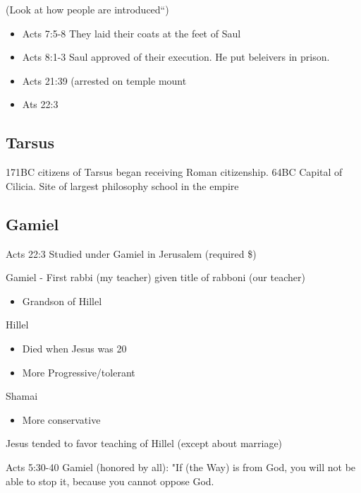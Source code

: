 \documentclass[
]{book}
\providecommand{\tightlist}{%
  \setlength{\itemsep}{0pt}\setlength{\parskip}{0pt}}
\begin{document}
(Look at how people are introduced``)

\begin{itemize}
\tightlist
\item
  Acts 7:5-8 They laid their coats at the feet of Saul
\item
  Acts 8:1-3 Saul approved of their execution. He put beleivers in prison.
\item
  Acts 21:39 (arrested on temple mount
\item
  Ats 22:3
\end{itemize}

\hypertarget{tarsus}{%
\subsection{Tarsus}\label{tarsus}}

171BC citizens of Tarsus began receiving Roman citizenship. 64BC Capital of Cilicia. Site of largest philosophy school in the empire

\hypertarget{gamiel}{%
\subsection{Gamiel}\label{gamiel}}

Acts 22:3 Studied under Gamiel in Jerusalem (required \$)

Gamiel - First rabbi (my teacher) given title of rabboni (our teacher)

\begin{itemize}
\tightlist
\item
  Grandson of Hillel
\end{itemize}

Hillel

\begin{itemize}
\tightlist
\item
  Died when Jesus was 20
\item
  More Progressive/tolerant
\end{itemize}

Shamai

\begin{itemize}
\tightlist
\item
  More conservative
\end{itemize}

Jesus tended to favor teaching of Hillel (except about marriage)

Acts 5:30-40 Gamiel (honored by all): "If (the Way) is from God, you will not be able to stop it, because you cannot oppose God.
\end{document}
